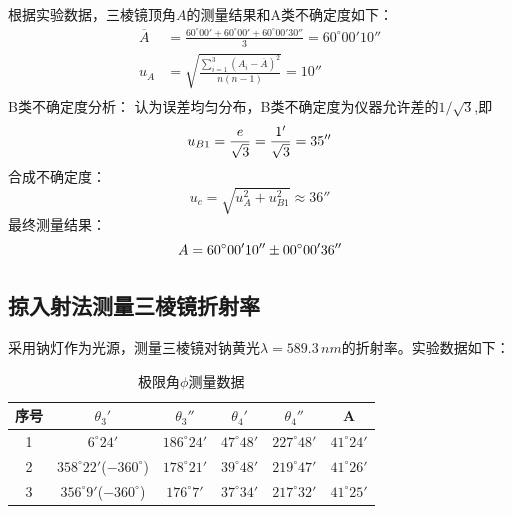 \documentclass[12pt]{article}
\begin{document}
\quad 根据实验数据，三棱镜顶角$A$的测量结果和A类不确定度如下：\\
\begin{align*}
    \overline{A} &= \frac{60^{\circ}00' + 60^{\circ}00' + 60^{\circ}00'30''}{3} = 60^{\circ}00'10'' \\
    u_A &= \sqrt{\frac{\sum_{i=1}^3(A_i-\overline{A})^2}{n(n-1)}} = 10'' \\
\end{align*}
\quad B类不确定度分析：
认为误差均匀分布，B类不确定度为仪器允许差的$1/\sqrt{3}$,即
\begin{equation*}
    u_{B1} = \frac{e}{\sqrt{3}} = \frac{1'}{\sqrt{3}}=35'' \\
\end{equation*}
\quad 合成不确定度：
\begin{equation*}
    u_c = \sqrt{u_A^2 + u_{B1}^2} \approx 36''
\end{equation*}
\quad 最终测量结果：
\begin{equation}
    A = 60^{\circ}00'10'' \pm 00^{\circ}00'36'' \\
\end{equation}    
\subsection{掠入射法测量三棱镜折射率}
\vspace{0.2cm}
\quad 采用钠灯作为光源，测量三棱镜对钠黄光$\lambda = 589.3\,nm$的折射率。实验数据如下：\\
\begin{table}[H]
    \centering
    \begin{tabular}{cccccc}
        序号 & $\theta_3'$     & $\theta_3''$     & $\theta_4'$      & $\theta_4''$     & A                   \\ \hline
        1  & $6^{\circ}24'$ & $186^{\circ}24'$ & $47^{\circ}48'$ & $227^{\circ}48'$ & $41^{\circ}24'$     \\
        2  & $358^{\circ}22'$($-360^{\circ}$) & $178^{\circ}21'$ & $39^{\circ}48'$ & $219^{\circ}47'$ & $41^{\circ}26'$     \\
        3  & $356^{\circ}9'$($-360^{\circ}$) & $176^{\circ}7'$ & $37^{\circ}34'$ & $217^{\circ}32'$ & $41^{\circ}25'$
        \end{tabular}
    \caption{极限角$\phi$测量数据}

\end{table}
\end{document}
